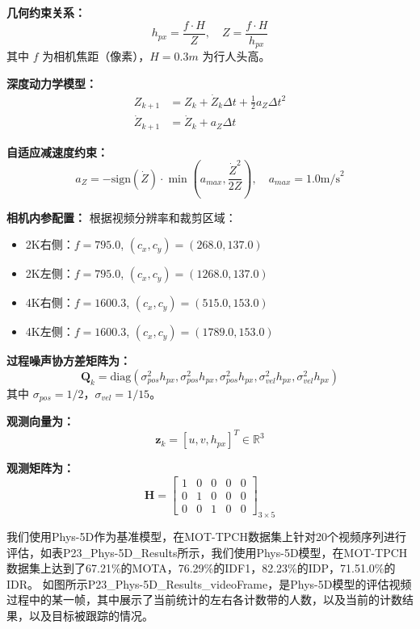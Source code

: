 \textbf{几何约束关系：}
\begin{equation}
h_{px} = \frac{f \cdot H}{Z}, \quad Z = \frac{f \cdot H}{h_{px}}
\end{equation}
其中 $f$ 为相机焦距（像素），$H = 0.3m$ 为行人头高。

\textbf{深度动力学模型：}
\begin{align}
Z_{k+1} &= Z_k + \dot{Z}_k \Delta t + \frac{1}{2}a_Z \Delta t^2 \\
\dot{Z}_{k+1} &= \dot{Z}_k + a_Z \Delta t
\end{align}

\textbf{自适应减速度约束：}
\begin{equation}
a_Z = -\text{sign}(\dot{Z}) \cdot \min\left(a_{max}, \frac{\dot{Z}^2}{2Z}\right), \quad a_{max} = 1.0 \text{m/s}^2
\end{equation}

\textbf{相机内参配置：}
根据视频分辨率和裁剪区域：
\begin{itemize}
    \item 2K右侧：$f = 795.0$, $(c_x, c_y) = (268.0, 137.0)$
    \item 2K左侧：$f = 795.0$, $(c_x, c_y) = (1268.0, 137.0)$
    \item 4K右侧：$f = 1600.3$, $(c_x, c_y) = (515.0, 153.0)$
    \item 4K左侧：$f = 1600.3$, $(c_x, c_y) = (1789.0, 153.0)$
\end{itemize}

\textbf{过程噪声协方差矩阵为：}
\begin{equation}
\mathbf{Q}_k = \text{diag}(\sigma_{pos}^2 h_{px}, \sigma_{pos}^2 h_{px}, \sigma_{pos}^2 h_{px}, \sigma_{vel}^2 h_{px}, \sigma_{vel}^2 h_{px})
\end{equation}
其中 $\sigma_{pos} = 1/2$，$\sigma_{vel} = 1/15$。

\textbf{观测向量为：}
\begin{equation}
\mathbf{z}_k = [u, v, h_{px}]^T \in \mathbb{R}^{3}
\end{equation}

\textbf{观测矩阵为：}
\begin{equation}
\mathbf{H} = \begin{bmatrix}
1 & 0 & 0 & 0 & 0 \\
0 & 1 & 0 & 0 & 0 \\
0 & 0 & 1 & 0 & 0
\end{bmatrix}_{3 \times 5}
\end{equation}

我们使用Phys-5D作为基准模型，在MOT-TPCH数据集上针对20个视频序列进行评估，如表P23_Phys-5D_Results所示，我们使用Phys-5D模型，在MOT-TPCH数据集上达到了67.21\%的MOTA，76.29\%的IDF1，82.23\%的IDP，71.51.0\%的IDR。
如图所示P23_Phys-5D_Results_videoFrame，是Phys-5D模型的评估视频过程中的某一帧，其中展示了当前统计的左右各计数带的人数，以及当前的计数结果，以及目标被跟踪的情况。


